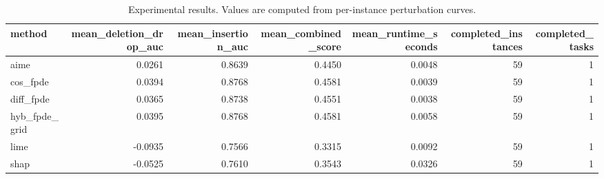 \begin{table}[t]
\caption{Experimental results. Values are computed from per-instance perturbation curves.}
\label{tab:main_results_computed}
\centering
\begin{tabular}{lrrrrrr}
\toprule
method & mean\_deletion\_drop\_auc & mean\_insertion\_auc & mean\_combined\_score & mean\_runtime\_seconds & completed\_instances & completed\_tasks \\
\midrule
aime & 0.0261 & 0.8639 & 0.4450 & 0.0048 & 59 & 1 \\
cos\_fpde & 0.0394 & 0.8768 & 0.4581 & 0.0039 & 59 & 1 \\
diff\_fpde & 0.0365 & 0.8738 & 0.4551 & 0.0038 & 59 & 1 \\
hyb\_fpde\_grid & 0.0395 & 0.8768 & 0.4581 & 0.0058 & 59 & 1 \\
lime & -0.0935 & 0.7566 & 0.3315 & 0.0092 & 59 & 1 \\
shap & -0.0525 & 0.7610 & 0.3543 & 0.0326 & 59 & 1 \\
\bottomrule
\end{tabular}

\end{table}
